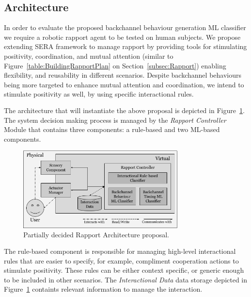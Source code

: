 \subsection{Architecture}
\label{sub:sec:solution:arch}

In order to evaluate the proposed backchannel behaviour generation \ac{ML} classifier we require a robotic rapport agent to be tested on human subjects. We propose extending \ac{SERA} framework to manage rapport by providing tools for stimulating positivity, coordination, and mutual attention (similar to Figure~\ref{table:BuildingRapportPlan} on Section~\ref{subsec:Rapport}) enabling flexibility, and reusability in different scenarios. Despite backchannel behaviours being more targeted to enhance mutual attention and coordination, we intend to stimulate positivity as well, by using specific interactional rules.

The architecture that will instantiate the above proposal is depicted in Figure~\ref{fig:rapport:archicture}. The system decision making process is managed by the \textit{Rapport Controller} Module that contains three components: a rule-based and two \ac{ML}-based components.

\begin{figure}
	\centering
	\includegraphics[width=0.75\textwidth]{images/Rapport_archtu.png}
	\caption{Partially decided Rapport Architecture proposal.}
	\label{fig:rapport:archicture}
\end{figure}

The rule-based component is responsible for managing high-level interactional rules that are easier to specify, for example, compliment cooperation actions to stimulate positivity. These rules can be either context specific, or generic enough to be included in other scenarios. The \textit{Interactional Data} data storage depicted in Figure~\ref{fig:rapport:archicture} containts relevant information to manage the interaction.

